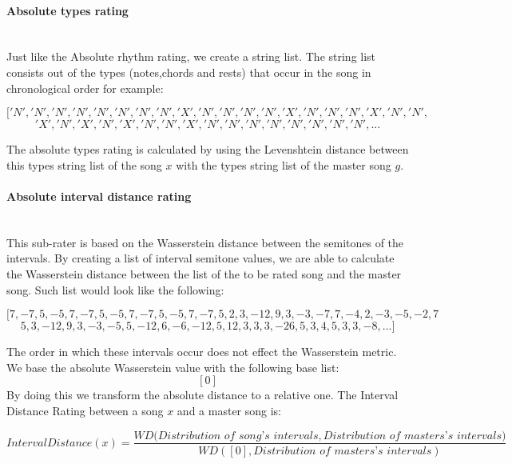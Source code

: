 \documentclass[a4paper]{article}
\begin{document}
\paragraph{Absolute types rating}\mbox{}\\
Just like the Absolute rhythm rating, we create a string list. The string list consists out of the types (notes,chords and rests) that occur in the song in chronological order for example:

 \[['N', 'N', 'N', 'N', 'N', 'N', 'N', 'N', 'X', 'N', 'N', 'N', 'N', 'X', 'N', 'N', 'N', 'X', 'N', 'N',\]
 \[ 'X', 'N', 'X', 'N', 'X', 'N', 'N', 'X', 'N', 'N', 'N', 'N', 'N', 'N', 'N', 'N',  ...\]
 
The absolute types rating is calculated by using the Levenshtein distance between this types string list of the song $x$ with the types string list of the master song $g$.

\paragraph{Absolute interval distance rating}\mbox{}\\
This sub-rater is based on the Wasserstein distance between the semitones of the intervals. By creating a list of interval semitone values, we are able to calculate the Wasserstein distance between the list of the to be rated song and the master song. Such list would look like the following:

 \[ [7, -7, 5, -5, 7, -7, 5, -5, 7, -7, 5, -5, 7, -7, 5, 2, 3, -12, 9, 3, -3, -7, 7, -4, 2, -3, -5, -2, 7\]
 \[ 5, 3, -12, 9, 3, -3, -5, 5, -12, 6, -6, -12, 5, 12, 3, 3, 3, -26, 5, 3, 4, 5, 3, 3, -8,...]\]
 
 The order in which these intervals occur does not effect the Wasserstein metric. We base the absolute Wasserstein value with the following base list:
  \[ [0]\]
  By doing this we transform the absolute distance to a relative one. The Interval Distance Rating between a song $x$ and a master song is:
  
  \[ IntervalDistance(x) =  \frac{WD(\textit{Distribution of song's intervals},\textit{{Distribution of masters's intervals})}} {WD([0],\textit{Distribution of masters's intervals})} \]
  
\end{document}
